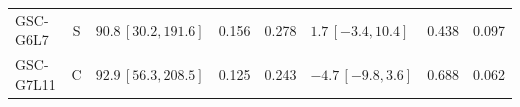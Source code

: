 \begin{longtable}{lcp{37mm}rrp{37mm}rr}
GSC-G6L7 & S & \(90.8\,[30.2,191.6]\) & 0.156 & 0.278 & \(1.7\,[-3.4,10.4]\) & 0.438 & 0.097\\
GSC-G7L11 & C & \(92.9\,[56.3,208.5]\) & 0.125 & 0.243 & \(-4.7\,[-9.8,3.6]\) & 0.688 & 0.062\\

\end{longtable}
